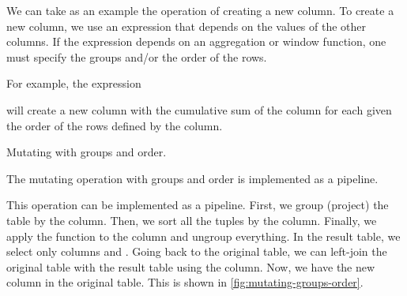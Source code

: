 We can take as an example the operation of creating a new column.  To create a new column,
we use an expression that depends on the values of the other columns.  If the expression
depends on an aggregation or window function, one must specify the groups and/or the order
of the rows.

For example, the expression
\begin{center}
\end{center}
will create a new column  with the cumulative sum of the  column for each
 given the order of the rows defined by the  column.

\begin{figurebox}[label=fig:mutating-groups-order]{Mutating with groups and order.}
  \centering
  \tcblower
  The mutating operation with groups and order is implemented as a pipeline.
\end{figurebox}

This operation can be implemented as a pipeline.  First, we group (project) the table by
the  column.  Then, we sort all the tuples by the  column. Finally,
we apply the  function to the  column and ungroup everything.  In the
result table, we select only columns  and .  Going back to the
original table, we can left-join the original table with the result table using the
 column.  Now, we have the new column  in the original table.
This is shown in \cref{fig:mutating-groups-order}.

